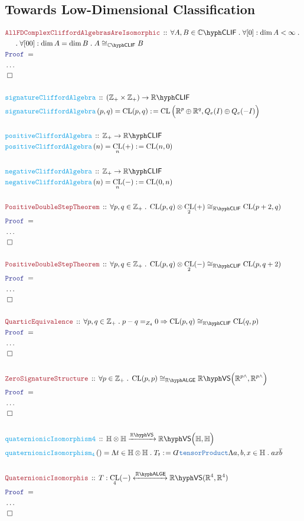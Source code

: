 \documentclass[12pt]{scrartcl}%
\newcommand{\TYPE}[1]{\textcolor{NavyBlue}{\mathtt{#1}}}%
\newcommand{\FUNC}[1]{\textcolor{Cerulean}{\mathtt{#1}}}%
\newcommand{\LOGIC}[1]{\textcolor{Blue}{\mathtt{#1}}}%
\newcommand{\THM}[1]{\textcolor{Maroon}{\mathtt{#1}}}%
\renewcommand{\.}{\; . \;} %
\newcommand{\de}{: \kern 0.1pc =} %
\newcommand{\Act}[1]{\left( #1 \right)} %
\newcommand{\Theorem}[2]{& \THM{#1} \, :: \, #2 \\ & \Proof = \\ } %
\newcommand{\DeclareFunc}[2]{& \FUNC{#1} \, :: \, #2 \\}%
\newcommand{\DefineNamedFunc}[4]{&  \FUNC{#1}\Act{#2} = #3 \de #4 \\}%
\newcommand{\NewLine}{\\ & \kern 1pc}%
\newcommand{\Page}[1]{ \begin{align*} #1 \end{align*}  }%
\newcommand{ \bd }{ \ByDef }%
\newcommand{\NoProof}{ & \ldots \\ \EndProof}%
\newcommand{\Int}{\mathbb{Z}}%
\newcommand{\Reals}{\mathbb{R}}%
\newcommand{\Complex}{\mathbb{C}}%
\newcommand{\Quat}{\mathbb{H}}%
\newcommand{\QED}{\; \square} %
\newcommand{\EndProof}{& \QED \\} %
\newcommand{\ByDef}{\rotatebox[origin=c]{-180}{$D$}}%
\newcommand{\Proof}{\LOGIC{Proof} \; } %
\newcommand{\Arrow}[1]{\xrightarrow{#1}}%
\newcommand{\ToIso}[1]{\xleftrightarrow{#1}}%
\newcommand{\VS}[1]{#1\hyph\mathsf{VS}} %
\newcommand{\LALGE}[1]{#1\hyph\mathsf{ALGE}}%
\newcommand{\CLIF}[1]{#1\hyph\mathsf{CLIF}}%
\DeclareMathOperator{\CL}{CL}%
\begin{document}
\subsection{Towards Low-Dimensional Classification}
\Page{ 
	\Theorem{AllFDComplexCliffordAlgebrasAreIsomorphic}
	{
		\forall A,B \in \CLIF{\Complex} \.
		\forall [0] : \dim A < \infty \. \NewLine \.
		\forall [00] : \dim A = \dim B \.  
		A \cong_{\CLIF{\Complex}} B
	}
	\NoProof
	\\
	\DeclareFunc{signatureCliffordAlgebra}{ 
		(\Int_+ \times \Int_+) \to \CLIF{\Reals} 
	}
	\DefineNamedFunc{signatureCliffordAlgebra}{p,q}
	{ \CL(p, q) }{ \CL\Big( \Reals^p \oplus \Reals^q, Q_e(I) \oplus Q_e(-I) \Big)   }
	\\
	\DeclareFunc{positiveCliffordAlgebra}{\Int_+ \to \CLIF{\Reals}}
	\DefineNamedFunc{positiveCliffordAlgebra}{n}{\CL_n(+)}{\CL(n,0)}
	\\
	\DeclareFunc{negativeCliffordAlgebra}{\Int_+ \to \CLIF{\Reals}}
	\DefineNamedFunc{negativeCliffordAlgebra}{n}{\CL_n(-)}{\CL(0,n)}
	\\
	\Theorem{PositiveDoubleStepTheorem}
	{
		\forall p,q \in \Int_+ \.
		\CL(p,q) \otimes \CL_2(+) \cong_{\CLIF{\Reals}} \CL(p+2,q)
	}
	\NoProof
	\\
	\Theorem{PositiveDoubleStepTheorem}
	{
		\forall p,q \in \Int_+ \.
		\CL(p,q) \otimes \CL_2(-) \cong_{\CLIF{\Reals}} \CL(p,q+2)
	}
	\NoProof
	\\
	\Theorem{QuarticEquivalence}
	{
		\forall p,q \in \Int_+ \.
		p - q =_{Z_4} 0 \Rightarrow \CL(p,q) \cong_{\CLIF{\Reals}} \CL(q,p)
	}
	\NoProof
	\\
	\Theorem{ZeroSignatureStructure}
	{
		\forall p \in \Int_+ \.
		\CL(p,p) \cong_{\LALGE{\Reals}} \VS{\Reals}\Big( \Reals^{p\wedge}, \Reals^{p\wedge} \Big)
	}
	\NoProof
	\\
	\DeclareFunc{quaternionicIsomorphism4}
	{
		\Quat \otimes \Quat \Arrow{\VS{\Reals}} \VS{\Reals}\Big( \Quat, \Quat \Big)
	}
	\DefineNamedFunc{quaternionicIsomorphism_4}{}{\Lambda t \in \Quat \otimes \Quat \. T_t}
	{ \bd \TYPE{tensorProduct} \Lambda a,b,x \in \Quat \. a x \overline{b}  }
	\\
	\Theorem{QuaternionicIsomorphis}
	{
		T : \CL_4(-) \ToIso{\LALGE{\Reals}} \VS{\Reals}(\Reals^4,\Reals^4)
	}
	\NoProof
}
\end{document}
